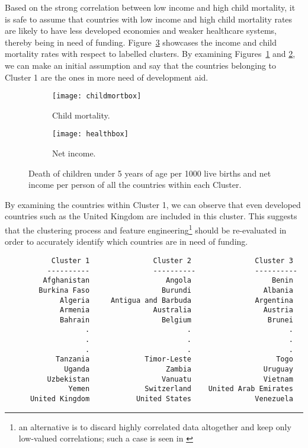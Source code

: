 \documentclass[
  course = {{DS12E Clustering Algorithms}},
  quartile = {{2}},
  assignment = 2,
  name = {{Michael Darmanis ; Vasilios Venieris}},
  studentnumber = {{7115152200004 ; 7115152200017}},
  email = {{mdarm@di.uoa.gr ; vvenieris@di.uoa.gr}},
  firstexercise = 1
]{aga-homework}
\begin{document}
Based on the strong correlation between low income and high child mortality, it is safe to assume that countries with low income and high child mortality rates are likely to have less developed economies and weaker healthcare systems, thereby being in need of funding. Figure~\ref{fig:pboxes} showcases the income and child mortality rates with respect to labelled clusters. By examining Figures~\ref{fig:pbox1} and \ref{fig:pbox2}, we can make an initial assumption and say that the countries belonging to Cluster 1 are the ones in more need of development aid.  

\begin{figure}[htbp!]
\centering
\begin{subfigure}{0.45\textwidth}
    \texttt{[image: childmortbox]}
    \caption{Child mortality.}
    \label{fig:pbox1}
\end{subfigure}
\hfill
\begin{subfigure}{0.45\textwidth}
    \texttt{[image: healthbox]}
    \caption{Net income.}
    \label{fig:pbox2}
\end{subfigure}
        
\caption{Death of children under 5 years of age per 1000 live births and net income per person of all the countries within each Cluster.}
\label{fig:pboxes}
\end{figure}
\newpage

By examining the countries within Cluster 1, we can observe that even developed countries such as the United Kingdom are included in this cluster. This suggests that the clustering process and feature engineering\footnote{an alternative is to discard highly correlated data altogether and keep only low-valued correlations; such a case is seen in \cite{notebook}} should be re-evaluated in order to accurately identify which countries are in need of funding.

\begin{verbatim}
           Cluster 1	           Cluster 2	           Cluster 3
          ----------	           ----------	           ----------
         Afghanistan	              Angola	               Benin
        Burkina Faso	             Burundi	             Albania
             Algeria	 Antigua and Barbuda	           Argentina
             Armenia	           Australia	             Austria
             Bahrain	             Belgium	              Brunei
                   .	                   .	                   .
                   .	                   .	                   .
                   .	                   .	                   .
            Tanzania	         Timor-Leste	                Togo
              Uganda	              Zambia	             Uruguay
          Uzbekistan	             Vanuatu	             Vietnam
               Yemen	         Switzerland	United Arab Emirates
      United Kingdom	       United States	           Venezuela
\end{verbatim}
\end{document}
